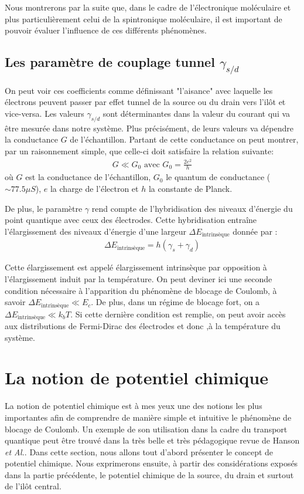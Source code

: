 Nous montrerons par la suite que, dans le cadre de l'électronique moléculaire et plus particulièrement celui de la spintronique moléculaire, il est important de pouvoir évaluer l'influence de ces différents phénomènes.

\subsection{Les paramètre de couplage tunnel $\gamma_{s/d}$}
On peut voir ces coefficients comme définissant "l'aisance" avec laquelle les électrons peuvent passer par effet tunnel de la source ou du drain vers l'il\^ot et vice-versa. Les valeurs $\gamma_{s/d}$ sont déterminantes dans la valeur du courant qui va \^etre mesurée dans notre système. Plus précisément, de leurs valeurs va dépendre la conductance $G$ de l'échantillon. Partant de cette conductance on peut montrer, par un raisonnement simple, que celle-ci doit satisfaire la relation suivante:
\begin{eqnarray}
G \ll G_0 \text{ avec } G_0 = \frac{2e^2}{h}
\end{eqnarray}
où $G$ est la conductance de l'échantillon, $G_0$ le quantum de conductance ($\sim 77.5 \mu S$), $e$ la charge de l'électron et $h$ la constante de Planck.


De plus, le paramètre $\gamma$ rend compte de l'hybridisation des niveaux d'énergie du point quantique avec ceux des électrodes. Cette hybridisation entraîne l'élargissement des niveaux d'énergie d'une largeur $\Delta E_{\text{intrinsèque}}$ donnée par :
\begin{eqnarray}
\Delta E_{\text{intrinsèque}} = h (\gamma_s + \gamma_d)
\end{eqnarray}

Cette élargissement est appelé élargissement intrinsèque par opposition à l'élargissement induit par la température. On peut deviner ici une seconde condition nécessaire à l'apparition du phénomène de blocage de Coulomb, à savoir $\Delta E_{\text{intrinsèque}} \ll E_c$. De plus, dans un régime de blocage fort, on a $\Delta E_{\text{intrinsèque}} \ll k_bT$. Si cette dernière condition est remplie, on peut avoir accès aux distributions de Fermi-Dirac des électrodes et donc ,à la température du système.




\section{La notion de potentiel chimique}
La notion de potentiel chimique est à mes yeux une des notions les plus importantes afin de comprendre de manière simple et intuitive le phénomène de blocage de Coulomb. Un exemple de son utilisation dans la cadre du transport quantique peut \^etre trouvé dans la très belle et très pédagogique revue de Hanson \textit{et Al.}. Dans cette section, nous allons tout d'abord présenter le concept de potentiel chimique. Nous exprimerons ensuite, à partir des considérations exposés dans la partie précédente, le potentiel chimique de la source, du drain et surtout de l'ilôt central.

